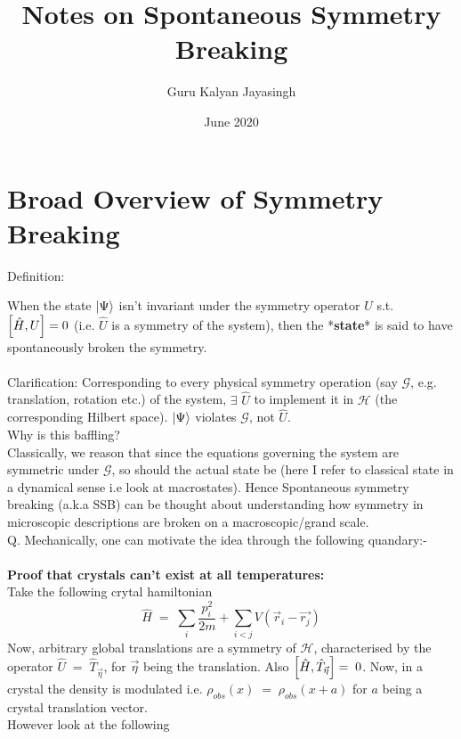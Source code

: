 \documentclass[12pt]{article}
\title{\Huge{Notes on Spontaneous Symmetry Breaking}}
\author{\Large{Guru Kalyan Jayasingh}}
\date{\Large{June 2020}}
\begin{document}
\begin{titlingpage}
\maketitle
\end{titlingpage}



\large
\section{Broad Overview of Symmetry Breaking}
Definition:

When the state $\ket{\Psi}$ isn't invariant under the symmetry operator $\hat{U}$
s.t. $\comm{\hat{H}}{U}=0$ (i.e. $\hat{U}$ is a symmetry of the system), then the *\textbf{state}* is said to have spontaneously broken the symmetry.\\
\\
Clarification: Corresponding to every physical symmetry operation (say $\mathcal{G}$, e.g. translation, rotation etc.) of the system, $\exists$ $\hat{U}$ to implement it in $\mathscr{H}$ (the corresponding Hilbert space). $\ket{\Psi}$ violates $\mathcal{G}$, not $\hat{U}$. \\
\newline
Why is this baffling?\\
Classically, we reason that since the equations governing the system are symmetric under $\mathcal{G}$, so should the actual state be (here I refer to classical state in a dynamical sense i.e look at macrostates). Hence Spontaneous symmetry breaking (a.k.a SSB) can be thought about understanding how symmetry in microscopic descriptions are broken on a macroscopic/grand scale.\\
Q. Mechanically, one can motivate the idea through the following quandary:-\\
\\
\textbf{Proof that crystals can't exist at all temperatures:}\\
Take the following crytal hamiltonian
$$\hat{H}\;=\;\sum_i \frac{p_i^2}{2m}+\sum_{i<j}V(\Vec{r}_i-\Vec{r_j})$$
Now, arbitrary global translations are a symmetry of $\mathcal{H}$, characterised by the operator $\hat{U}\;=\;\hat{T}_{\Vec{\eta}}$, for $\Vec{\eta}$ being the translation. Also $\comm{\hat{H}}{\hat{T}_{\Vec{\eta}}}=\;0$. Now, in a crystal the density is modulated i.e. $\rho_{obs}(x)\;=\;\rho_{obs}(x+a)$ for $a$ being a crystal translation vector.\\
However look at the following
\end{document}
